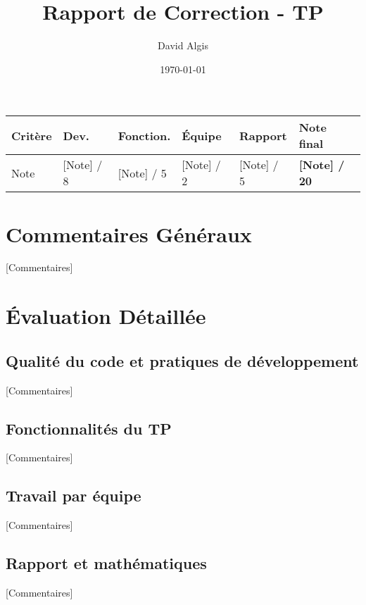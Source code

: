 \documentclass[a4paper,12pt]{article}
\title{Rapport de Correction - TP}
\author{David Algis}
\date{\today}
\begin{document}
\maketitle

\begin{tabularx}{\textwidth}{|X|X|X|X|X|X|}
\hline
Critère & Dev. & Fonction. & Équipe & Rapport & \textbf{Note final} \\
\hline
Note & [Note] / 8 & [Note] / 5 & [Note] / 2 & [Note] / 5 & \textbf{[Note] / 20} \\
\hline
\end{tabularx}

\section*{Commentaires Généraux}

[Commentaires]

\section*{Évaluation Détaillée}

\subsection*{Qualité du code et pratiques de développement}

[Commentaires]

\subsection*{Fonctionnalités du TP}

[Commentaires]

\subsection*{Travail par équipe}

[Commentaires]

\subsection*{Rapport et mathématiques}

[Commentaires]
\end{document}
